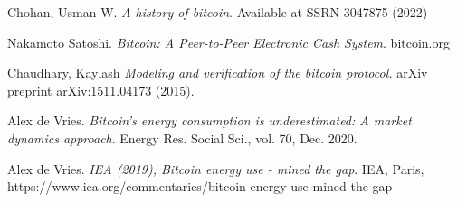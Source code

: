 \documentclass[a4paper]{article}
\begin{document}

\begin{thebibliography}{9}


 Chohan, Usman W. \emph{A history of bitcoin}. Available at SSRN 3047875 (2022)

 Nakamoto Satoshi. \emph{Bitcoin: A Peer-to-Peer Electronic Cash System}. bitcoin.org

 Chaudhary, Kaylash \emph{Modeling and verification of the bitcoin protocol.} arXiv preprint arXiv:1511.04173 (2015).

 Alex de Vries. \emph{Bitcoin’s energy consumption is underestimated: A market dynamics approach}. Energy Res. Social Sci., vol. 70, Dec. 2020.

 Alex de Vries. \emph{IEA (2019), Bitcoin energy use - mined the gap}.  IEA, Paris, https://www.iea.org/commentaries/bitcoin-energy-use-mined-the-gap 



\end{thebibliography}
\end{document}
